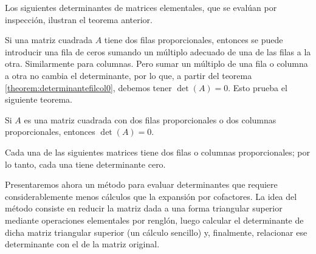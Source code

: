 \begin{examplebox}{}{}
    Los siguientes determinantes de matrices elementales, que se evalúan por inspección, ilustran el teorema anterior.
    \begin{matrizn}
    \end{matrizn}
\end{examplebox}

Si una matriz cuadrada $A$ tiene dos filas proporcionales, entonces se puede introducir una fila de ceros sumando un múltiplo adecuado de una de las filas a la otra. Similarmente para columnas. Pero sumar un múltiplo de una fila o columna a otra no cambia el determinante, por lo que, a partir del teorema \ref{theorem:determinantefilcol0}, debemos tener $\det(A) = 0$. Esto prueba el siguiente teorema.

\begin{theorem}{}{}
    Si $A$ es una matriz cuadrada con dos filas proporcionales o dos columnas proporcionales, entonces $\det(A) = 0$.
\end{theorem}

\begin{examplebox}{}{}
    Cada una de las siguientes matrices tiene dos filas o columnas proporcionales; por lo tanto, cada una tiene determinante cero.
    \begin{matrizn}
    \end{matrizn}
\end{examplebox}

Presentaremos ahora un método para evaluar determinantes que requiere considerablemente menos cálculos que la expansión por cofactores. La idea del método consiste en reducir la matriz dada a una forma triangular superior mediante operaciones elementales por renglón, luego calcular el determinante de dicha matriz triangular superior (un cálculo sencillo) y, finalmente, relacionar ese determinante con el de la matriz original.

